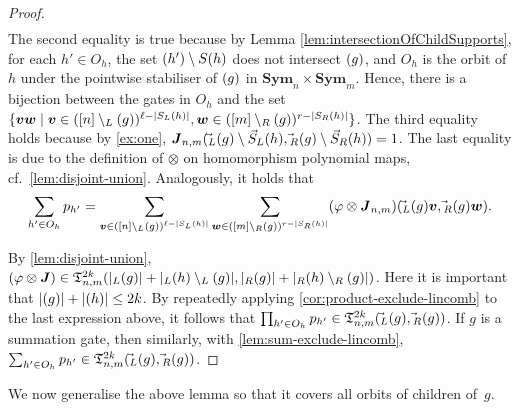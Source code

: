 \documentclass[10pt,a4paper]{article}
\theoremstyle{definition}
\theoremstyle{plain}
\theoremstyle{remark}
\renewcommand{\phi}{\varphi}
\newcommand{\Sym}{\mathbf{Sym}}
\let\sup\relax
\DeclareMathOperator{\sup}{sup}
\begin{document}
\begin{proof}
\begin{align*}
 		\end{align*}
 		The second equality is true because by Lemma \ref{lem:intersectionOfChildSupports}, for each $h' \in O_h$, 
 		the set $\sup(h') \setminus S(h)$ does not intersect $\sup(g)$, and $O_h$ is the orbit of $h$ under the pointwise stabiliser of $\sup(g)$ in $\Sym_n \times \Sym_m$. Hence, there is a bijection between the gates in $O_h$ and the set $\{  \boldsymbol{v}\boldsymbol{w} \mid  \boldsymbol{v} \in ([n] \setminus \sup_L(g))^{\ell - |S_L(h)|},  \boldsymbol{w} \in ([m] \setminus \sup_R(g))^{r - |S_R(h)|}  \}$.
 		The third equality holds because by \cref{ex:one}, $\boldsymbol{J}_{n,m}(\vec{\sup}_L(g) \setminus \vec{S}_L(h), \vec{\sup}_R(g) \setminus \vec{S}_R(h))= 1$. The last equality is due to the definition of $\otimes$ on homomorphism polynomial maps, cf.\ \cref{lem:disjoint-union}.
 		Analogously, 
 		it holds that
 		\[
 			\sum_{h' \in O_h} p_{h'}
 			=
 			\sum_{\boldsymbol{v} \in ([n] \setminus \sup_L(g))^{\ell - |S_L(h)|}} 
 			\sum_{\boldsymbol{w} \in ([m] \setminus \sup_R(g))^{r - |S_R(h)|}} (\phi \otimes \boldsymbol{J}_{n,m})(\vec{\sup}_L(g) \boldsymbol{v}, \vec{\sup}_R(g) \boldsymbol{w}).
 		\]
 		
 		By \cref{lem:disjoint-union}, $(\phi \otimes \boldsymbol{J}) \in \mathfrak{T}_{n,m}^{2k}(|\sup_L(g)|+|\sup_L(h) \setminus \sup_L(g)|, |\sup_R(g)|+|\sup_R(h) \setminus \sup_R(g)|)$. 
 		Here it is important that $| \sup(g)| + |\sup(h)| \leq 2k$.
 		By repeatedly applying \cref{cor:product-exclude-lincomb} to the last expression above,
 		it follows that $\prod_{h' \in O_h} p_{h'} \in \mathfrak{T}^{2k}_{n,m}(\vec{\sup}_L(g), \vec{\sup}_R(g))$.
 		If $g$ is a summation gate, then similarly, with \cref{lem:sum-exclude-lincomb}, $\sum_{h' \in O_h} p_{h'} \in \mathfrak{T}^{2k}_{n,m}(\vec{\sup}_L(g), \vec{\sup}_R(g))$.
 	\end{proof}
 	
 	We now generalise the above lemma so that it covers all orbits of children of~$g$.
 	
\end{document}
